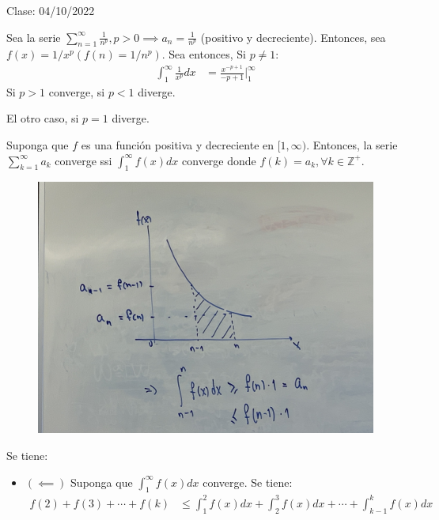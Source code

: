 Clase: 04/10/2022

\begin{ejemplo}
    Sea la serie $\sum_{n=1}^{\infty} \frac{1}{n^p},p>0\implies a_n=\frac{1}{n^p}$ (positivo y decreciente). Entonces, sea $f(x)=1/x^p (f(n)=1/n^p)$. 
    Sea entonces, 
    Si $p\neq 1$:
    \begin{align}
        \int_1^{\infty}\frac{1}{x^p}dx &= \frac{x^{-p+1}}{-p+1}\Big|_1^{\infty}
    \end{align}
    Si $p>1$ converge, si $p<1$ diverge. 
    
    
    El otro caso, si $p=1$ diverge. 

\end{ejemplo}
\begin{teorema}
    Suponga que $f$ es una función positiva y decreciente en $[1,\infty)$. Entonces, la serie 
    $\sum_{k=1}^{\infty}a_k$ converge ssi $\int_1^{\infty}f(x)dx$ converge donde $f(k)=a_k,\forall k\in \mathbb{Z}^+$.
    \begin{figure}[H]
        \centering
        \includegraphics[scale=0.2]{imagenes/18.jpeg}
    \end{figure}
    \begin{dem}
        Se tiene:
        \begin{itemize}
            \item $(\impliedby)$ Suponga que $\int_1^{\infty}f(x)dx$ converge. Se tiene:
            \begin{align*}
                f(2)+f(3)+\cdots + f(k) &\leq \int_1^2 f(x)dx+\int_2^3 f(x)dx +\cdots +\int_{k-1}^k f(x)dx\\

\end{align*}
\end{itemize}
\end{dem}
\end{teorema}
